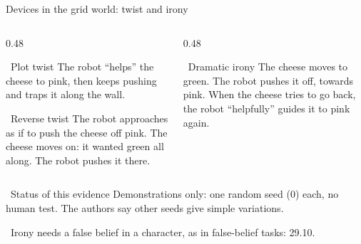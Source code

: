 \documentclass[aspectratio=169,10pt]{beamer}
\newcommand{\seminar}[1]{{\scriptsize\color{gray}\faLink\ #1}}
\newcommand{\slideendspace}{\vspace{0.3em}}
\begin{document}
\begin{frame}{Devices in the grid world: twist and irony}
\begin{columns}[T,onlytextwidth]

\begin{column}{0.48\textwidth}
\begin{block}{\faRandom\ Plot twist}
The robot ``helps'' the cheese to pink, then keeps pushing and traps it along the wall.
\end{block}
\begin{block}{\faUndo\ Reverse twist}
The robot approaches as if to push the cheese off pink. The cheese moves on: it wanted green all along. The robot pushes it there.
\end{block}
\end{column}

\begin{column}{0.48\textwidth}
\begin{block}{\faEye\ Dramatic irony}
The cheese moves to green. The robot pushes it off, towards pink. When the cheese tries to go back, the robot ``helpfully'' guides it to pink again.
\end{block}
\end{column}

\end{columns}

\slideendspace
\begin{alertblock}{\faExclamationTriangle\ Status of this evidence}
Demonstrations only: one random seed (0) each, \alert{no human test}. The authors say other seeds give simple variations.
\end{alertblock}
\seminar{Irony needs a false belief in a character, as in false-belief tasks: 29.10.}
\end{frame}
\end{document}
